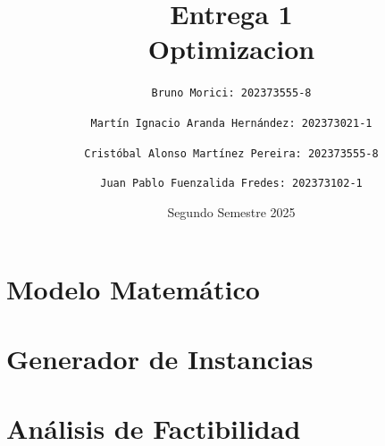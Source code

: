 \documentclass[12pt, spanish]{article}
\title{
    \Large
    \textbf{Entrega 1 \\ Optimizacion} \\[1ex]
    \emph{\textquote{Proyecto Semestral}}
}
\author{
    \texttt{Bruno Morici: 202373555-8} \and
    \texttt{Martín Ignacio Aranda Hernández: 202373021-1} \and
    \texttt{Cristóbal Alonso Martínez Pereira: 202373555-8} \and
    \texttt{Juan Pablo Fuenzalida Fredes: 202373102-1}
}
\date{Segundo Semestre 2025}
\begin{document}
\maketitle
\thispagestyle{fancy}

\setcounter{tocdepth}{1}
\tableofcontents

\newpage
\section{Modelo Matemático}


\newpage
\section{Generador de Instancias}


\newpage
\section{Análisis de Factibilidad}

\end{document}
